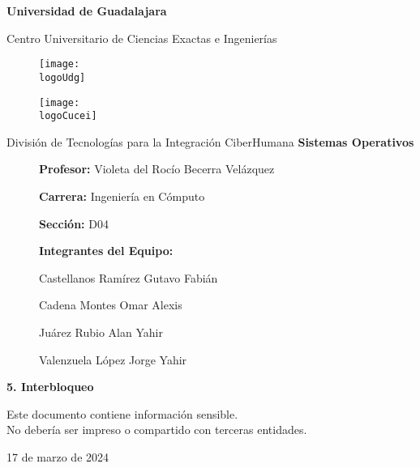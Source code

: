 \documentclass[12pt, a4paper]{article} %
\title{\theTitle}
\author{\theAuthor}
\newcommand{\logoUdg}{../../../../attachments/images/portada-udg.jpeg}
\newcommand{\logoCucei}{../../../../attachments/images/portada-cucei.jpeg}
\newcommand{\materia}{Sistemas Operativos}
\newcommand{\theTitle}{5. Interbloqueo}
\newcommand{\profesor}{Violeta del Rocío Becerra Velázquez}
\newcommand{\theAuthor}{Juárez Rubio Alan Yahir}
\newcommand{\carrera}{Ingeniería en Cómputo}
\newcommand{\seccion}{D04}
\newcommand{\startDate}{17 de marzo de 2024}
\newcommand{\aAuthor}{Castellanos Ramírez Gutavo Fabián}
\newcommand{\bAuthor}{Cadena Montes Omar Alexis}
\newcommand{\cAuthor}{Valenzuela López Jorge Yahir}
\newcommand{\nl}{\par\vspace{0.4cm}}
\begin{document}
\cfoot{\ifodd\value{page}\else\thepage\fi} %

\begin{titlepage}
	\centering
	{\huge\textbf{Universidad de Guadalajara}}\par\vspace{0.6cm}
	{\LARGE{Centro Universitario de Ciencias Exactas e Ingenierías}}\vfill
	
	\begin{figure}[h]
		\begin{minipage}[t]{0.45\textwidth}
			\centering
			\texttt{[image: \\logoUdg]}
		\end{minipage}
		\hfill
		\begin{minipage}[t]{0.45\textwidth}
			\centering
			\texttt{[image: \\logoCucei]}
		\end{minipage}
	\end{figure}\vfill
	
	{\Large{División de Tecnologías para la Integración CiberHumana}}\vfill\vfill
	{\Large\textbf{\materia}}\vfill
	\begin{figure}[h]
		\centering
		\begin{minipage}[t]{0.75\textwidth}
			{\Large
				\textbf{Profesor:} \profesor\nl
				\textbf{Carrera:} \carrera\nl
				\textbf{Sección:} \seccion
			}
		\end{minipage}
	\end{figure}\vfill
	
	\begin{figure}[h]
		\centering
		\begin{minipage}[t]{0.75\textwidth}
			\centering
			{\Large \textbf{Integrantes del Equipo:}}\nl
			{\large
				\aAuthor\nl
				\bAuthor\nl
				\theAuthor\nl
				\cAuthor\nl
			}
		\end{minipage}
	\end{figure}

	{\LARGE{\textbf{\theTitle}}}\vfill
	
	\begin{tcolorbox}[colback=red!5!white, colframe=red!75!black]
		\centering
		Este documento contiene información sensible.\\
		No debería ser impreso o compartido con terceras entidades.
	\end{tcolorbox}\vfill
	{\large \startDate}\par
\end{titlepage}
\end{document}
